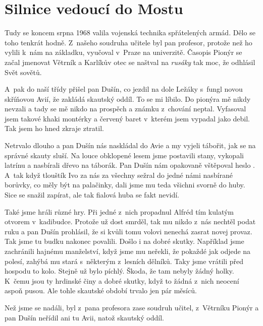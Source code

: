 
\chapter{Silnice vedoucí do Mostu}

Tudy se koncem srpna 1968 valila vojenská technika spřátelených armád. Dělo se
toho tenkrát hodně. Z~našeho soudruha učitele byl pan profesor, protože než ho
vylili k~nám na základku, vyučoval v~Praze na univerzitě. Časopis Pionýr se
začal jmenovat Větrník a Karlíkův otec se naštval na {\em rusáky} tak moc, že
odhlásil Svět sovětů.

A~pak do naší třídy přišel pan Dušín, co jezdil na dole Ležáky s~fungl novou
skříňovou Avií, že zakládá skautský oddíl. To se mi líbilo. Do pionýra mě nikdy
nevzali a tady se mě nikdo na prospěch a známku z~chování neptal. Vyfasoval
jsem takové khaki montérky a červený baret v~kterém jsem vypadal jako debil.
Tak jsem ho hned zkraje ztratil.

Netrvalo dlouho a pan Dušín nás naskládal do Avie a my vyjeli tábořit, jak se
na správné skauty sluší. Na louce obklopené lesem jsme postavili stany,
vykopali latrínu a nasbírali dřevo na táborák. Pan Dušín nám opakovaně
vštěpoval heslo . A~tak když tlouštík
Ivo za nás za všechny sežral do jedné námi nasbírané borůvky, co měly být na
palačinky, dali jsme mu teda všichni svorně do huby. Sice se snažil zapírat,
ale tak fialová huba se fakt nevidí.

Také jsme hráli různé hry. Při jedné z~nich propadnul Alfréd tím kulatým
otvorem v~kadibudce. Protože už dost smrděl, tak mu nikdo z~nás nechtěl podat
ruku a pan Dušín prohlásil, že si kvůli tomu volovi nenechá zasrat novej
provaz. Tak jsme tu budku nakonec povalili. Došlo i na dobré skutky. Například
jsme zachránili hajnému manželství, když jsme mu neřekli, že pokaždé jak odjede
na polesí, zahýbá mu stará s~některým z~lesních dělníků. Taky jsme vrátili před
hospodu to kolo. Stejně už bylo píchlý. Škoda, že tam nebyly žádný holky.
K~čemu jsou ty hrdinské činy a dobré skutky, když to žádná z~nich neocení aspoň
pusou. Ale tohle skautské období trvalo jen pár měsíců.

Než jsme se nadáli, byl z~pana profesora zase soudruh učitel, z~Větrníku Pionýr
a pan Dušín neřídil ani tu Avii, natož skautský oddíl.

